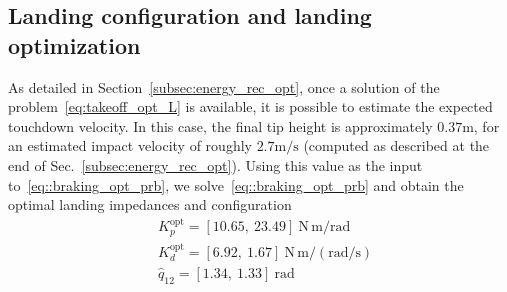 \subsection{Landing configuration and landing optimization}\label{sec:land_conf}
As detailed in Section~\ref{subsec:energy_rec_opt}, once a solution of the problem~\eqref{eq:takeoff_opt_L} is available, it is possible to estimate the expected touchdown velocity. In this case, the final tip height is approximately $0.37\mathrm{m}$, for an estimated impact velocity of roughly $2.7\mathrm{m/s}$ (computed as described at the end of Sec.~\ref{subsec:energy_rec_opt}). Using this value as the input to~\eqref{eq::braking_opt_prb}, we solve~\eqref{eq::braking_opt_prb} and obtain the optimal landing impedances and configuration
\begin{align}
&K_p^{\mathrm{opt}} = \left[10.65,~23.49\right]~\mathrm{N\,m/rad}\label{eq:optimal_braking_sol}\\
&K_d^{\mathrm{opt}} = \left[6.92,~1.67\right]~\mathrm{N\,m/(rad/s)}\nonumber\\
&\hat{q}_{12} = \left[1.34,~1.33\right]~\mathrm{rad}\nonumber
\end{align}


